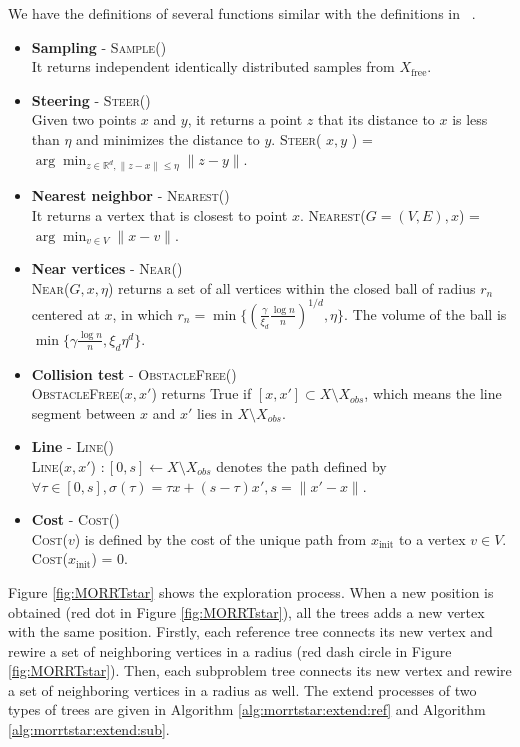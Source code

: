\documentclass[conference]{IEEEtran}
\begin{document}
We have the definitions of several functions similar with the definitions in ~\cite{Karaman.Frazzoli:RSS10}.
\begin{itemize}
	\item \textbf{Sampling} - \textsc{Sample}() \\
	It returns independent identically distributed samples from $ X_{\mbox{free}} $.
	\item \textbf{Steering} - \textsc{Steer}() \\
	Given two points $ x $ and $ y $, it returns a point $ z $ that its distance to $ x $ is less than $ \eta $ and minimizes the distance to $ y $. 
	\textsc{Steer}( $ x,y $ ) = $ \arg \min_{ z \in \mathbb{R}^{d}, \lVert z -x \rVert \leq \eta } \lVert z - y \rVert $.
	\item \textbf{Nearest neighbor} - \textsc{Nearest}() \\
	It returns a vertex that is closest to point $ x $.
	\textsc{Nearest}($ G = (V,E), x $) = $ \arg \min_{v \in V} \lVert x - v \rVert $.
	\item \textbf{Near vertices} - \textsc{Near}() \\
	\textsc{Near}($ G, x, \eta $) returns a set of all vertices within the closed ball of radius $ r_{n} $ centered at $ x $, in which $ r_{n} = \min \{ ( \frac{\gamma}{\xi_{d}} \frac{\log n}{n} )^{1/d}  , \eta \} $.
	The volume of the ball is $ \min \{ \gamma \frac{\log n}{n} , \xi_{d} \eta^{d} \} $.
	\item \textbf{Collision test} - \textsc{ObstacleFree}() \\
	\textsc{ObstacleFree}($ x, x' $) returns True if $ [ x, x' ] \subset X \setminus X_{obs} $, which means the line segment between $ x $ and $ x' $ lies in $ X \setminus X_{obs} $.
	\item \textbf{Line} - \textsc{Line}() \\
	\textsc{Line}($ x, x' $) $ : [0, s] \leftarrow X \setminus X_{obs} $ denotes the path defined by $ \forall \tau \in [0, s], \sigma( \tau ) = \tau x + (s - \tau) x', s = \lVert x' -x \rVert $.
	\item \textbf{Cost} - \textsc{Cost}() \\
	\textsc{Cost}($ v  $) is defined by the cost of the unique path from $ x_{ \mbox{init} } $ to a vertex $ v \in V $.
	\textsc{Cost}($ x_{ \mbox{init} } $) = $ 0 $.
\end{itemize}

Figure \ref{fig:MORRTstar} shows the exploration process.
When a new position is obtained (red dot in Figure \ref{fig:MORRTstar}), all the trees adds a new vertex with the same position.
Firstly, each reference tree connects its new vertex and rewire a set of neighboring vertices in a radius (red dash circle in Figure \ref{fig:MORRTstar}).
Then, each subproblem tree connects its new vertex and rewire a set of neighboring vertices in a radius as well.
The extend processes of two types of trees are given in Algorithm \ref{alg:morrtstar:extend:ref} and Algorithm \ref{alg:morrtstar:extend:sub}.
\end{document}
